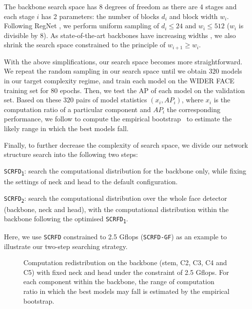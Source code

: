 \documentclass[10pt,twocolumn,letterpaper]{article}
\newcommand{\dsname}[1]{\texttt{\small #1}\xspace}
\newcommand{\scrfd}{\dsname{SCRFD}}
\newcommand{\scrfdv}[1]{\dsname{SCRFD\textsubscript{#1}}}
\newcommand{\scrfdf}[1]{\dsname{SCRFD-\text{#1}GF}}
\newenvironment{tight_itemize}{
\begin{itemize}[leftmargin=20pt]
  \setlength{\topsep}{0pt}
  \setlength{\itemsep}{0pt}
  \setlength{\parskip}{0pt}
  \setlength{\parsep}{0pt}
}{\end{itemize}}
\begin{document}
The backbone search space has 8 degrees of freedom as there are 4 stages and each stage $i$ has 2 parameters: the number of blocks $d_i$ and block width $w_i$. Following RegNet \cite{radosavovic2020designing}, we perform uniform sampling of $d_i\leq 24$ and $w_i\leq 512$ ($w_i$ is divisible by 8). 
As state-of-the-art backbones have increasing widths \cite{radosavovic2020designing}, we also shrink the search space constrained to the principle of $w_{i+1}\ge w_i$.

With the above simplifications, our search space becomes more straightforward. We repeat the random sampling in our search space until we obtain $320$ models in our target complexity regime, and train each model on the WIDER FACE training set for $80$ epochs. Then, we test the AP of each model on the validation set. 
Based on these $320$ pairs of model statistics $(x_i, AP_i)$, where $x_i$ is the computation ratio of a particular component and $AP_i$ the corresponding performance, we follow \cite{radosavovic2020designing} to compute the empirical bootstrap~\cite{Efron1994} to estimate the likely range in which the best models fall. 

Finally, to further decrease the complexity of search space, we divide our network structure search into the following two steps:
\begin{tight_itemize}
\item \scrfdv{1}: search the computational distribution for the backbone only, while fixing the settings of neck and head to the default configuration.
\item \scrfdv{2}: search the computational distribution over the whole face detector (\ie backbone, neck and head), with the computational distribution within the backbone following the optimised \scrfdv{1}. 
\end{tight_itemize}
Here, we use \scrfd constrained to 2.5 Gflops (\scrfdf{2.5}) as an example to illustrate our two-step searching strategy.

\begin{figure*}
\centering
{}
\caption{Computation redistribution on the backbone (stem, C2, C3, C4 and C5) with fixed neck and head under the constraint of 2.5 Gflops. 
For each component within the backbone, the range of computation ratio in which the best models may fall is estimated by the empirical bootstrap. }
\label{fig:computationoptimizationbackbone}
\end{figure*}
\end{document}
